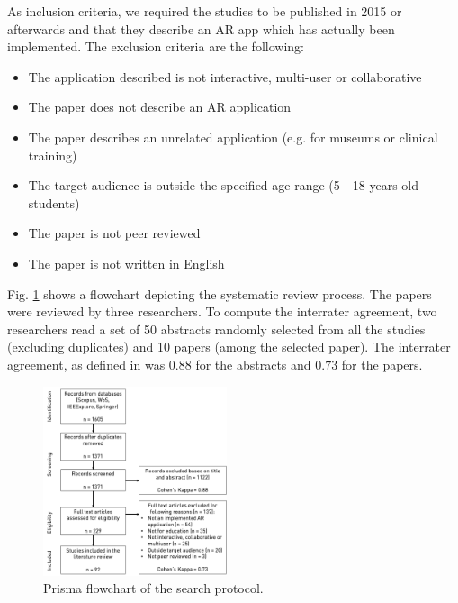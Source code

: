 As inclusion criteria, we required the studies to be published in 2015 or afterwards and that they describe an AR app which has actually been implemented. The exclusion criteria are the following:

\begin{itemize}
    \item The application described is not interactive, multi-user or collaborative
    \item The paper does not describe an AR application
    \item The paper describes an unrelated application (e.g. for museums or clinical training)
    \item The target audience is outside the specified age range (5 - 18 years old students)
    \item The paper is not peer reviewed
    \item The paper is not written in English
\end{itemize}

Fig. \ref{fig:flowchart} shows a flowchart depicting the systematic review process. The \papersToRead papers were reviewed by three researchers. To compute the interrater agreement, two researchers read a set of 50 abstracts randomly selected from all the studies (excluding duplicates) and 10 papers (among the \papersSelected selected paper). The interrater agreement, as defined in \citep{cohen1960coefficient} was $0.88$ for the abstracts and $0.73$ for the papers.

\begin{figure}[ht]	
	\begin{center}
	\includegraphics[width=0.48\textwidth]{figures/prisma.png}
	\caption{Prisma flowchart of the search protocol.}
	\label{fig:flowchart}
    \end{center}
\end{figure}


